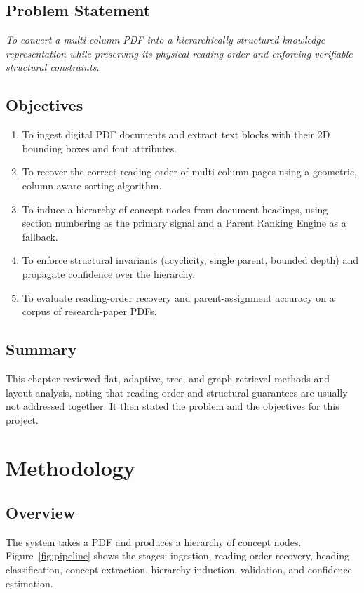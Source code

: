 \documentclass[12pt,a4paper,twoside,openright]{report}
\begin{document}
\section{Problem Statement}
\textit{To convert a multi-column PDF into a hierarchically structured knowledge
representation while preserving its physical reading order and enforcing verifiable
structural constraints.}

\section{Objectives}
\begin{enumerate}
  \item To ingest digital PDF documents and extract text blocks with their 2D
  bounding boxes and font attributes.
  \item To recover the correct reading order of multi-column pages using a geometric,
  column-aware sorting algorithm.
  \item To induce a hierarchy of concept nodes from document headings, using section
  numbering as the primary signal and a Parent Ranking Engine as a fallback.
  \item To enforce structural invariants (acyclicity, single parent, bounded depth) and
  propagate confidence over the hierarchy.
  \item To evaluate reading-order recovery and parent-assignment accuracy on a corpus
  of research-paper PDFs.
\end{enumerate}

\section{Summary}
This chapter reviewed flat, adaptive, tree, and graph retrieval methods and layout
analysis, noting that reading order and structural guarantees are usually not addressed
together. It then stated the problem and the objectives for this project.

\chapter{Methodology}

\section{Overview}
The system takes a PDF and produces a hierarchy of concept nodes. Figure~\ref{fig:pipeline}
shows the stages: ingestion, reading-order recovery, heading classification, concept
extraction, hierarchy induction, validation, and confidence estimation.
\end{document}
